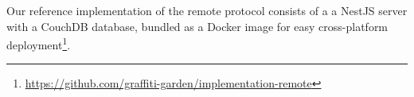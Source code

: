 Our reference implementation of the remote protocol
consists of a a NestJS server with a CouchDB database,
bundled as a Docker image for easy cross-platform
deployment\footnote{
\url{https://github.com/graffiti-garden/implementation-remote}
}.





